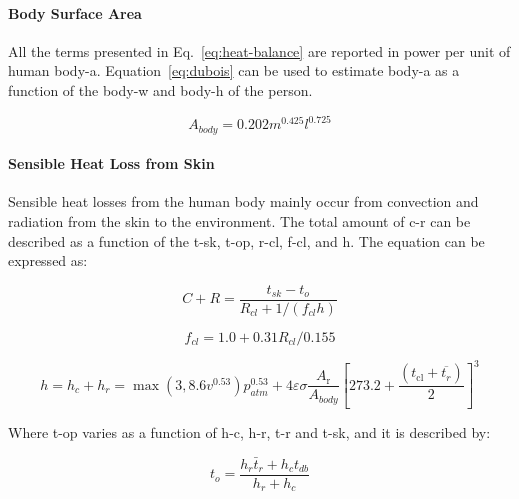 \paragraph{Body Surface Area}

All the terms presented in Eq.~\ref{eq:heat-balance} are reported in power per unit of human \ac{body-a}.
 Equation~\ref{eq:dubois} can be used to estimate \ac{body-a} as a function of the \ac{body-w} and \ac{body-h} of the person.

\begin{equation}
    A_{body} = 0.202 m^{0.425} l^{0.725}\label{eq:dubois}
\end{equation}


\paragraph{Sensible Heat Loss from Skin}

Sensible heat losses from the human body mainly occur from convection and radiation from the skin to the environment.
The total amount of \ac{c-r} can be described as a function of the \ac{t-sk}, \ac{t-op}, \ac{r-cl}, \ac{f-cl}, and \ac{h}.
The equation can be expressed as:

\begin{equation}
    C+R=\frac{t_{s k}-t_{o}}{R_{c l}+1 /\left(f_{c l} h\right)}\label{eq:c-r}
\end{equation}

\begin{equation}
    f_{cl}=1.0 + 0.31 R_{cl} / 0.155\label{eq:f-cl}
\end{equation}

\begin{equation}
    h=h_{c} + h_{r} = \max(3, 8.6 v^{0.53}) p_{atm}^{0.53} + 4 \varepsilon \sigma \frac{A_{\mathrm{r}}}{A_{body}}\left[273.2+\frac{\left(t_{\mathrm{cl}}+\overline{t_{r}}\right)}{2}\right]^{3}\label{eq:h}
\end{equation}


Where \ac{t-op} varies as a function of \ac{h-c}, \ac{h-r}, \ac{t-r} and \ac{t-sk}, and it is described by:

\begin{equation}
    t_{o}=\frac{h_{r} \bar{t}_{r}+h_{c} t_{db}}{h_{r}+h_{c}}\label{eq:t-op}
\end{equation}


